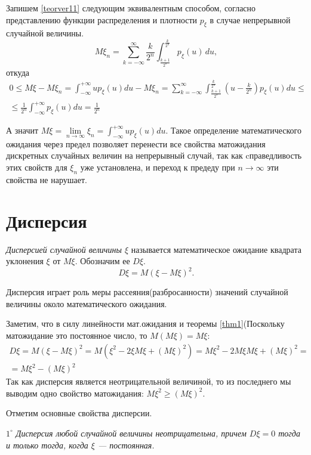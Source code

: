 Запишем \eqref{teorver11} следующим эквивалентным способом, согласно представлению функции распределения и плотности $p_\xi$ в случае непрерывной случайной величины.
$$
M\xi_n = \sum\limits^{\infty}_{k=-\infty} \frac{k}{2^n}\int_{\frac{k+1}{2^n}}^{\frac{k}{2^n}}p_\xi(u)\,du,
$$
откуда 
\begin{multline*}
0\le M\xi-M\xi_n=\int_{-\infty}^{+\infty}up_\xi(u)du - M\xi_n = \sum\limits^{\infty}_{k=-\infty}\int_{\frac{k+1}{2^n}}^{\frac{k}{2^n}}\left(u-\frac{k}{2^n}\right)p_\xi(u)du \le \\ \le \frac{1}{2^n}\int_{-\infty}^{+\infty}p_\xi(u)du=\frac{1}{2^n}
\end{multline*}

А значит $M\xi=\lim\limits_{n\to\infty}\xi_n=\int_{-\infty}^{+\infty}up_\xi(u)du$. Такое определение математического ожидания через предел позволяет перенести все свойства матожидания дискретных случайных величин на непрерывный случай, так как cправедливость этих свойств для $\xi_n$ уже установлена, и переход к предеду при $n\to\infty$ эти свойства не нарушает.


\section{Дисперсия}
\begin{defn}
\textit{Дисперсией случайной величины $\xi$} называется математическое ожидание квадрата уклонения $\xi$ от $M\xi$. Обозначим ее $D\xi$. 
\begin{equation} \label{ch31.4eq1}
D\xi=M(\xi-M\xi)^2.
\end{equation}
\end{defn}

Дисперсия играет роль меры рассеяния(разбросанности) значений случайной величины около математического ожидания.

Заметим, что в силу линейности мат.ожидания и теоремы \ref{thm1}\;(Поскольку матожидание это постоянное число, то $M(M\xi)=M\xi$:
\begin{multline*}
D\xi = M(\xi-M\xi)^2=M(\xi^2-2\xi M\xi+(M\xi)^2)=M\xi^2-2M\xi M\xi+(M\xi)^2=\\=M\xi^2-(M\xi)^2
\end{multline*}
Так как дисперсия является неотрицательной величиной, то из последнего мы выводим одно свойство матожидания: $M\xi^2\ge(M\xi)^2$.

Отметим основные свойства дисперсии.

$1^{\circ}$ \textit{Дисперсия любой случайной величины неотрицательна, причем $D\xi = 0$ тогда и только тогда, когда $\xi$ --- постоянная. }

